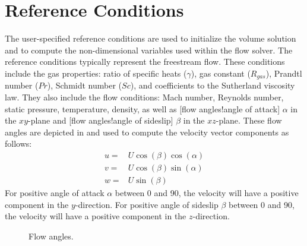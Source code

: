 \section{Reference Conditions}
\label{SEC:Reference_Conditions}

The user-specified reference conditions are used to initialize
the volume solution and to compute the non-dimensional variables
used within the flow solver.
%
The reference conditions typically represent the freestream flow.
%
These conditions include the gas properties:
ratio of specific heats ($\gamma$),
gas constant ($R_{gas}$),
Prandtl number ($Pr$),
Schmidt number ($Sc$), and
coefficients to the Sutherland viscosity law.
%
They also include the flow conditions:
Mach number, Reynolds number, static pressure, temperature, density,
as well as
[flow angles!angle of attack]
$\alpha$ in the $xy$-plane and
[flow angles!angle of sideslip]
$\beta$ in the $xz$-plane.
%
%
These flow angles are depicted in  and used
to compute the velocity vector components as follows:
\begin{align}
  u =& U \cos{(\beta)} \cos{(\alpha)} \label{EQN:FlowAngleVelX} \\
  v =& U \cos{(\beta)} \sin{(\alpha)} \label{EQN:FlowAngleVelY} \\
  w =& U \sin{(\beta)}                \label{EQN:FlowAngleVelZ}
\end{align}
%
For positive angle of attack $\alpha$ between 0 and 90, the velocity will
have a positive component in the $y$-direction.
%
For positive angle of sideslip $\beta$ between 0 and 90, the velocity will
have a positive component in the $z$-direction.

%
%

\begin{figure}[htb]
  \begin{centering}
    \caption{Flow angles.}
    \label{FIG:FlowAngle}
  \end{centering}
\end{figure}

